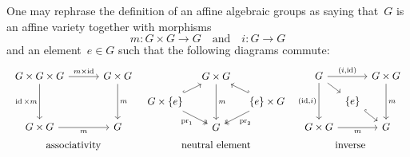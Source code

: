 \begin{remark}
  One may rephrase the definition of an affine algebraic groups as saying that~$G$ is an affine variety together with morphisms
  \[
            m
    \colon  G \times G
    \to     G
    \quad\text{and}\quad
            i
    \colon  G
    \to     G
  \]
  and an element~$e \in G$ such that the following diagrams commute:
  \[
    \renewcommand{\arraystretch}{1.5}
    \renewcommand{\arraycolsep}{3.3pt}
    \begin{array}{ccc}
        \begin{tikzcd}[column sep = 30pt, row sep = 35pt]
            G \times G \times G
            \arrow{r}[above]{m \times \id}
            \arrow{d}[left]{\id \times m}
          & G \times G
            \arrow{d}[right]{m}
          \\
            G \times G
            \arrow{r}[below]{m}
          & G
        \end{tikzcd}
      &
        \begin{tikzcd}[column sep = 10pt, row sep = 9pt]
            {}
          & G \times G
            \arrow{dd}[right]{m}
          & {}
          \\
            G \times \{e\}
            \arrow[hook]{ur}
            \arrow[two heads]{dr}[below left]{\pr_1}
          & {}
          & \{e\} \times G
            \arrow[hook']{ul}
            \arrow[two heads]{dl}[below right]{\pr_2}
          \\
            {}
          & G
          & {}
        \end{tikzcd}
      &
        \begin{tikzcd}[column sep = 3pt, row sep = 9pt]
            G
            \arrow{rr}[above]{(i,\id)}
            \arrow{dd}[left]{(\id,i)}
            \arrow{dr}
          & {}
          & G \times G
            \arrow{dd}[right]{m}
          \\
            {}
          & \{e\}
            \arrow[hook]{dr}
          & {}
          \\
            G \times G
            \arrow{rr}[below]{m}
          & {}
          & G
        \end{tikzcd}
    \\
        \text{associativity}
      & \text{neutral element}
      & \text{inverse}
    \end{array}
  \]


\end{remark}
